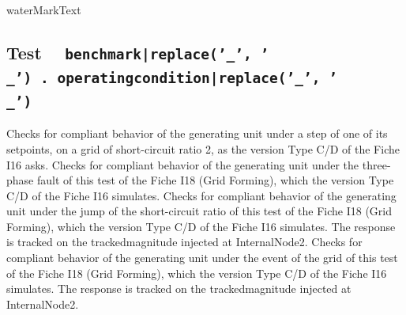 
    {{ waterMarkText }}

    \renewcommand{\DTRPcs}{\detokenize{%
{{ benchmark }}%
}}
    \renewcommand{\PCSname}{PCS_RTE-I16z1}
    \renewcommand{\OCname}{\detokenize{%
{{ operatingcondition }}%
}}


    \subsection{Test \texttt{%
{{ benchmark|replace('_', '\\_') }}.{{ operatingcondition|replace('_', '\\_') }}%
}}

    Checks for compliant behavior of the generating unit under a step of one of its setpoints,
    on a grid of short-circuit ratio 2, as the version Type C/D of the Fiche I16 asks.
    \GridCircuitZoneSetPoint
    Checks for compliant behavior of the generating unit under the three-phase fault of this
    test of the Fiche I18 (Grid Forming), which the version Type C/D of the Fiche I16 simulates.
    \GridCircuitZoneFault
    Checks for compliant behavior of the generating unit under the jump of the short-circuit
    ratio of this test of the Fiche I18 (Grid Forming), which the version Type C/D of the Fiche I16
    simulates. The response is tracked on the {{ trackedmagnitude }} injected at InternalNode2.
    Checks for compliant behavior of the generating unit under the event of the grid of this
    test of the Fiche I18 (Grid Forming), which the version Type C/D of the Fiche I16 simulates.
    The response is tracked on the {{ trackedmagnitude }} injected at InternalNode2.
    \GridCircuitZoneSetPoint

